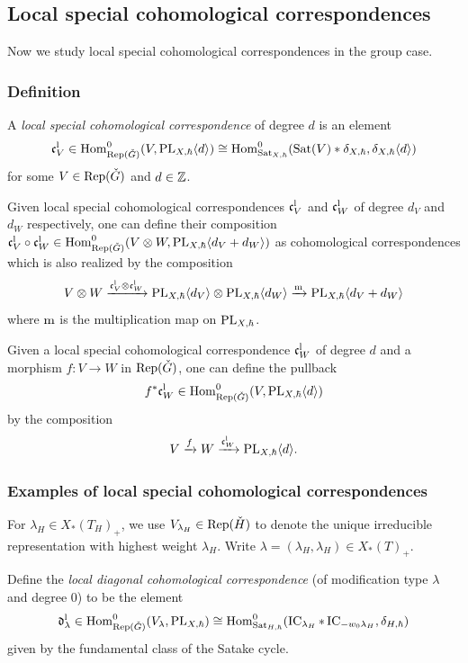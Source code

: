 \documentclass[reqno]{amsart}
\numberwithin{equation}{section}
\numberwithin{equation}{section}
\begin{document}
\subsection{Local special cohomological correspondences}
Now we study local special cohomological correspondences in the group case.
\subsubsection{Definition}
A \emph{local special cohomological correspondence} of degree $d$ is an element \[\mathfrak{c}_{V}^{\mathrm{l}} \in \operatorname{Hom}^0_{\operatorname{Rep}(\check{G})}(V,\mathrm{PL}_{X,\hbar}\langle d\rangle)\cong \operatorname{Hom}^0_{\operatorname{Sat}_{X,\hbar}}(\operatorname{Sat}(V)*\delta_{X,\hbar},\delta_{X,\hbar}\langle d\rangle )\] for some $V\in \operatorname{Rep}(\check{G})$ and $d\in\mathbb{Z}$.

Given local special cohomological correspondences $\mathfrak{c}_{V}^{\mathrm{l}}$ and $\mathfrak{c}_{W}^{\mathrm{l}}$ of degree $d_V$ and $d_W$ respectively, one can define their composition $\mathfrak{c}_{V}^{\mathrm{l}}\circ \mathfrak{c}_{W}^{\mathrm{l}}\in \operatorname{Hom}^0_{\operatorname{Rep}(\check{G})}(V\otimes W,\mathrm{PL}_{X,\hbar}\langle d_V+d_W\rangle)$ as cohomological correspondences which is also realized by the composition \[V\otimes W\xrightarrow{\mathfrak{c}_V^{\mathrm{l}}\otimes \mathfrak{c}_W^{\mathrm{l}}} \mathrm{PL}_{X,\hbar}\langle d_V\rangle \otimes \mathrm{PL}_{X,\hbar}\langle d_W\rangle\xrightarrow{\mathrm{m}} \mathrm{PL}_{X,\hbar}\langle d_V+d_W\rangle\] where $\mathrm{m}$ is the multiplication map on $\mathrm{PL}_{X,\hbar}$.


Given a local special cohomological correspondence $\mathfrak{c}_W^{\mathrm{l}}$ of degree $d$ and a morphism $f:V\to W$ in $\operatorname{Rep}(\check{G})$, one can define the pullback \begin{equation}\label{eq:pullbackloccor} f^*\mathfrak{c}_W^{\mathrm{l}}\in \operatorname{Hom}^0_{\operatorname{Rep}(\check{G})}(V,\mathrm{PL}_{X,\hbar}\langle d\rangle)\end{equation} by the composition \[V\xrightarrow{f} W\xrightarrow{\mathfrak{c}_W^{\mathrm{l}}} \mathrm{PL}_{X,\hbar}\langle d\rangle.\]

\subsubsection{Examples of local special cohomological correspondences}

For $\lambda_H\in X_*(T_H)_+$, we use $V_{\lambda_H}\in \operatorname{Rep}(\check{H})$ to denote the unique irreducible representation with highest weight $\lambda_H$. Write $\lambda=(\lambda_H,\lambda_H)\in X_*(T)_+$.

Define the \emph{local diagonal cohomological correspondence} (of modification type $\lambda$ and degree $0$) to be the element \begin{equation}\label{eq:diagcorloc}
    \mathfrak{d}_{\lambda}^{\mathrm{l}}\in \operatorname{Hom}^0_{\operatorname{Rep}(\check{G})}(V_{\lambda},\mathrm{PL}_{X,\hbar})\cong \operatorname{Hom}^0_{\operatorname{Sat}_{H,\hbar}}(\operatorname{IC}_{\lambda_H}*\operatorname{IC}_{-w_0\lambda_H},\delta_{H,\hbar})
\end{equation}
given by the fundamental class of the Satake cycle.
\end{document}
